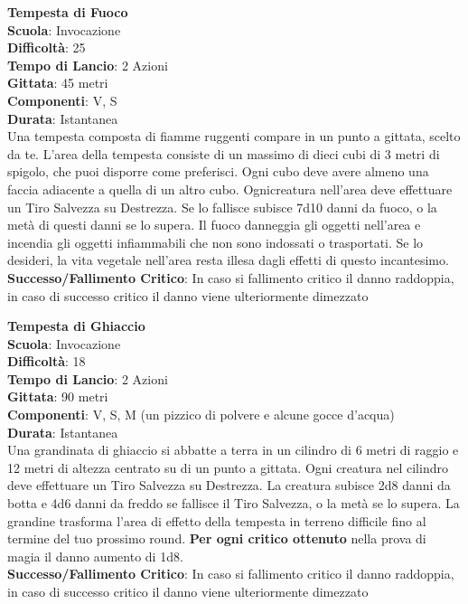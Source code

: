 \begin{multicols}{2}
\medskip\textbf{Tempesta di Fuoco}\\
\textbf{Scuola}: Invocazione\\
\textbf{Difficoltà}:  25\\
\textbf{Tempo di Lancio}: 2 Azioni\\
\textbf{Gittata}: 45 metri\\
\textbf{Componenti}: V, S\\
\textbf{Durata}: Istantanea\\
Una tempesta composta di fiamme ruggenti compare in un punto a gittata, scelto da te. L’area della tempesta consiste di un massimo di dieci cubi di 3 metri di spigolo, che puoi disporre come preferisci. Ogni cubo deve avere almeno una faccia adiacente a quella di un altro cubo. Ognicreatura nell'area deve effettuare un Tiro Salvezza su Destrezza. Se lo fallisce subisce 7d10  danni da fuoco, o la metà di questi danni se lo supera. Il fuoco danneggia gli oggetti nell'area e incendia gli oggetti infiammabili che non sono indossati o trasportati. Se lo desideri, la vita vegetale nell'area resta illesa dagli effetti di questo incantesimo. \\
\textbf{Successo/Fallimento Critico}: In caso si fallimento critico il danno raddoppia, in caso di successo critico il danno viene ulteriormente dimezzato

\medskip\textbf{Tempesta di Ghiaccio}\\
\textbf{Scuola}: Invocazione\\
\textbf{Difficoltà}:  18\\
\textbf{Tempo di Lancio}: 2 Azioni\\
\textbf{Gittata}: 90 metri\\
\textbf{Componenti}: V, S, M (un pizzico di polvere e alcune gocce d’acqua)\\
\textbf{Durata}: Istantanea\\
Una grandinata di ghiaccio si abbatte a terra in un cilindro di 6 metri di raggio e 12 metri di altezza centrato su di un punto a gittata. Ogni creatura nel cilindro deve effettuare un Tiro Salvezza su Destrezza. La creatura subisce 2d8 danni da botta e 4d6 danni da freddo se fallisce il  Tiro Salvezza, o la metà se lo supera. La grandine trasforma l’area di effetto della tempesta in terreno difficile fino al termine del tuo prossimo round.
\textbf{Per ogni critico ottenuto} nella prova di magia il danno aumento di 1d8.\\
\textbf{Successo/Fallimento Critico}: In caso si fallimento critico il danno raddoppia, in caso di successo critico il danno viene ulteriormente dimezzato


\end{multicols}
